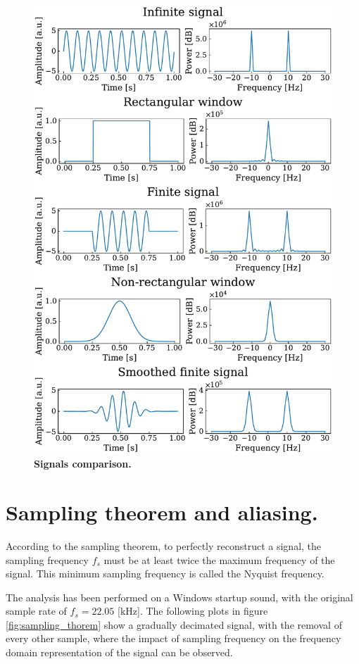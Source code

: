 \documentclass[13pt,a4paper]{article}
\begin{document}
\begin{figure}[ht!]
    \centering
    \includegraphics[width=0.9\linewidth]{spectra_comparison.pdf}
    \caption{\textbf{Signals comparison.}}
    \label{fig:comparison}
\end{figure}
\clearpage


\section{Sampling theorem and aliasing.}

According to the sampling theorem, to perfectly reconstruct a signal, the sampling frequency $f_s$ must be at least twice the maximum frequency of the signal. This minimum sampling frequency is called the Nyquist frequency.

The analysis has been performed on a Windows startup sound, with the original sample rate of $f_s=22.05$ [kHz]. The following plots in figure \ref{fig:sampling_thorem} show a gradually decimated signal, with the removal of every other sample, where the impact of sampling frequency on the frequency domain representation of the signal can be observed.
\end{document}
